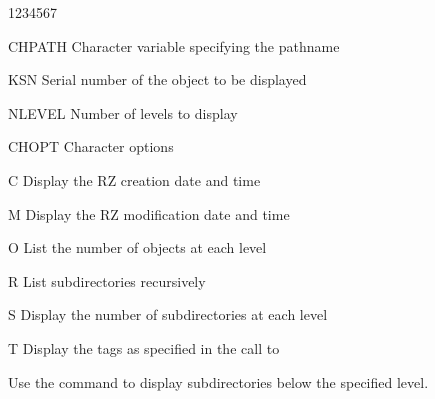 \begin{DLtt}{1234567}
\item[CHPATH]Character variable specifying the pathname
\item[KSN]Serial number of the object to be displayed
\item[NLEVEL]Number of levels to display
\item[CHOPT]Character options
  \begin{DLtt}{1}
    \item[C]Display the RZ creation date and time
    \item[M]Display the RZ modification date and time
    \item[O]List the number of objects at each level
    \item[R]List subdirectories recursively
    \item[S]Display the number of subdirectories at each level
    \item[T]Display the tags as specified in the call to 
  \end{DLtt}
\end{DLtt}

Use the  command to display subdirectories below the specified
level.


